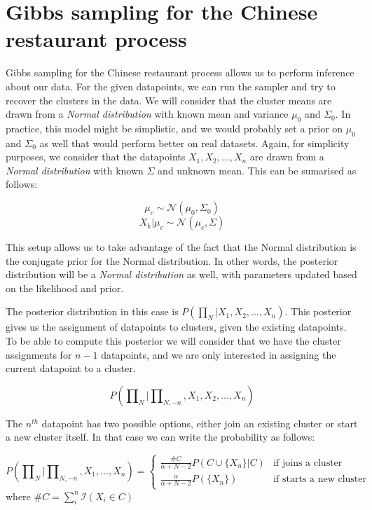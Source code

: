 \documentclass[12pt,a4paper]{article}
\begin{document}
\section{Gibbs sampling for the Chinese restaurant process}
Gibbs sampling for the Chinese restaurant process allows us to perform inference about our data. For the given datapoints, we can run the sampler and try to recover the clusters in the data. We will consider that the cluster means are drawn from a \textit{Normal distribution} with known mean and variance $\mu_{0}$ and $\Sigma_{0}$. In practice, this model might be simplistic, and we would probably set a prior on $\mu_{0}$ and $\Sigma_{0}$ as well that would perform better on real datasets. Again, for simplicity purposes, we consider that the datapoints $X_{1}, X_{2}, ..., X_{n}$ are drawn from a \textit{Normal distribution} with known $\Sigma$ and unknown mean. This can be sumarised as follows: 

$$ \mu_{c} \sim \mathcal{N}(\mu_{0}, \Sigma_{0})$$
$$ X_{k}|\mu_{c} \sim \mathcal{N}(\mu_{c}, \Sigma) $$

This setup allows us to take advantage of the fact that the Normal distribution is the conjugate prior for the Normal distribution. In other words, the posterior distribution will be a \textit{Normal distribution} as well, with parameters updated based on the likelihood and prior.

The posterior distribution in this case is $P(\prod\nolimits_{N}|X_{1}, X_{2}, ..., X_{n})$. This posterior gives us the assignment of datapoints to clusters, given the existing datapoints. To be able to compute this posterior we will consider that we have the cluster assignments for $n-1$ datapoints, and we are only interested in assigning the current datapoint to a cluster. 

$$P(\prod\nolimits_{N}|\prod\nolimits_{N, -n}, X_{1}, X_{2}, ..., X_{n})$$

The $n^{th}$ datapoint has two possible options, either join an existing cluster or start a new cluster itself. In that case we can write the probability as follows: 

$$P(\prod\nolimits_{N}|\prod\nolimits_{N, -n}, X_{1}, ..., X_{n}) = \left \{
    \begin{array}{ll}
		\frac{\#C}{\alpha+ N - 2}P(C \cup \{X_{n}\}|C) & \mbox{if joins a cluster} \\
		\frac{\alpha}{\alpha+N-2}P(\{X_{n}\}) & \mbox{if starts a new cluster} 
	\end{array}
\right.$$
where $\#C = \sum_{i}^{n}\mathcal{I}(X_{i} \in C)$
\end{document}
